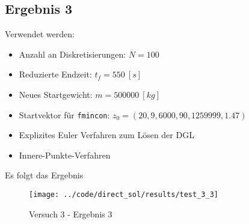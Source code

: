 \newpage
\subsection{Ergebnis 3}\label{kap:Versuch33}
Verwendet werden:
\begin{itemize}
\item Anzahl an Diskretisierungen: $N = 100$ 
\item Reduzierte Endzeit: $t_f = 550 \ [s]$
\item Neues Startgewicht: $m = 500000 \ [kg]$
\item Startvektor für \texttt{fmincon}: $z_0 = (20,9,6000,90,1259999,1.47)$
\item Explizites Euler Verfahren zum Lösen der DGL
%
\item Innere-Punkte-Verfahren
\end{itemize}
Es folgt das Ergebnis
\begin{figure}[H]
\begin{center}
\texttt{[image: ../code/direct\_sol/results/test\_3\_3]}
\caption{Versuch 3 - Ergebnis 3}\label{img:test_3_3}
\end{center}
\end{figure}












\newpage
